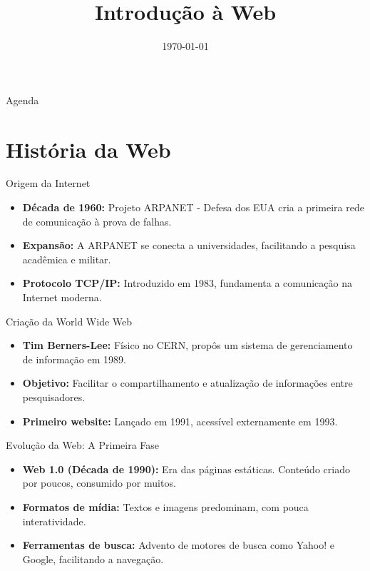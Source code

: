 \title{Introdução à Web}
\date{\today}
\frame{\titlepage}

\begin{frame}{Agenda}
  \tableofcontents
\end{frame}

\section{História da Web}
\begin{frame}{Origem da Internet}
  \begin{itemize}
    \item \textbf{Década de 1960:} Projeto ARPANET - Defesa dos EUA cria a primeira rede de comunicação à prova de falhas.
    \item \textbf{Expansão:} A ARPANET se conecta a universidades, facilitando a pesquisa acadêmica e militar.
    \item \textbf{Protocolo TCP/IP:} Introduzido em 1983, fundamenta a comunicação na Internet moderna.
  \end{itemize}
\end{frame}

\begin{frame}{Criação da World Wide Web}
  \begin{itemize}
    \item \textbf{Tim Berners-Lee:} Físico no CERN, propôs um sistema de gerenciamento de informação em 1989.
    \item \textbf{Objetivo:} Facilitar o compartilhamento e atualização de informações entre pesquisadores.
    \item \textbf{Primeiro website:} Lançado em 1991, acessível externamente em 1993.
  \end{itemize}
\end{frame}

\begin{frame}{Evolução da Web: A Primeira Fase}
  \begin{itemize}
    \item \textbf{Web 1.0 (Década de 1990):} Era das páginas estáticas. Conteúdo criado por poucos, consumido por muitos.
    \item \textbf{Formatos de mídia:} Textos e imagens predominam, com pouca interatividade.
    \item \textbf{Ferramentas de busca:} Advento de motores de busca como Yahoo! e Google, facilitando a navegação.
  \end{itemize}
\end{frame}


